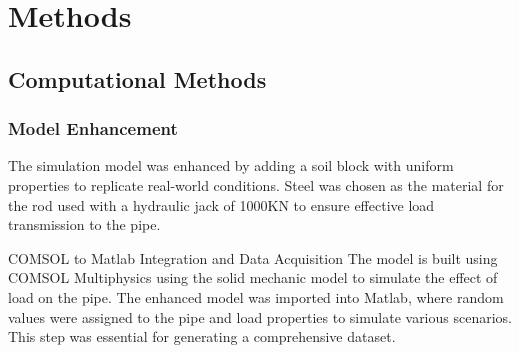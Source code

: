 \chapter{Methods}
\noindent
\section{Computational Methods}
\label{sec:compmeth}

\subsection{Model Enhancement}
The simulation model was enhanced by adding a soil block with uniform properties to replicate real-world conditions. Steel was chosen as the material for the rod used with a hydraulic jack of 1000KN to ensure effective load transmission to the pipe.

COMSOL to Matlab Integration and Data Acquisition
The model is built using COMSOL Multiphysics using the solid mechanic model to simulate the effect of load on the pipe. The enhanced model was imported into Matlab, where random values were assigned to the pipe and load properties to simulate various scenarios. This step was essential for generating a comprehensive dataset.

